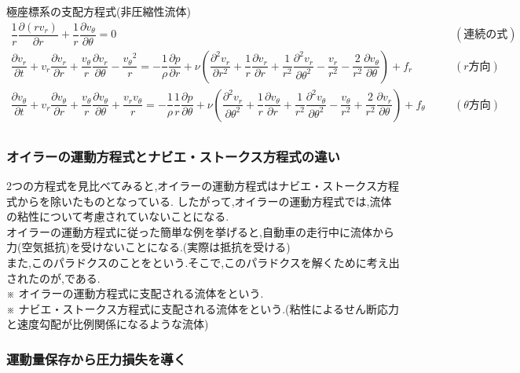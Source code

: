 \documentclass[a4paper]{jsarticle}
\begin{document}
\begin{itembox}[l]{極座標系の支配方程式\quad(非圧縮性流体)}
    \begin{eqnarray*}
        \dfrac{1}{r}\dfrac{\partial \left(rv_r\right)}{\partial r}+\dfrac{1}{r}\dfrac{\partial v_\theta}{\partial \theta}=0\quad&&(連続の式)\\
        \dfrac{\partial v_r}{\partial t}+v_r\dfrac{\partial v_r}{\partial r}+\dfrac{v_\theta}{r}\dfrac{\partial v_r}{\partial \theta}-\dfrac{{v_\theta}^2}{r}=-\dfrac{1}{\rho}\dfrac{\partial p}{\partial r}+\nu \left(\dfrac{\partial^2 v_r}{\partial r^2}+\dfrac{1}{r}\dfrac{\partial v_r}{\partial r}+\dfrac{1}{r^2}\dfrac{\partial^2 v_r}{\partial \theta^2}-\dfrac{v_r}{r^2}-\dfrac{2}{r^2}\dfrac{\partial v_\theta}{\partial \theta}\right)+f_r\quad&&(r方向)\\
        \dfrac{\partial v_\theta}{\partial t}+v_r\dfrac{\partial v_\theta}{\partial r}+\dfrac{v_\theta}{r}\dfrac{\partial v_\theta}{\partial \theta}+\dfrac{v_rv_\theta}{r}=-\dfrac{1}{\rho}\dfrac{1}{r}\dfrac{\partial p}{\partial \theta}+\nu\left(\dfrac{\partial^2 v_r}{\partial \theta^2}+\dfrac{1}{r}\dfrac{\partial v_\theta}{\partial r}+\dfrac{1}{r^2}\dfrac{\partial^2 v_\theta}{\partial \theta^2}-\dfrac{v_\theta}{r^2}+\dfrac{2}{r^2}\dfrac{\partial v_r}{\partial \theta}\right)+f_\theta\quad&&(\theta 方向)\\
    \end{eqnarray*}
\end{itembox}
\subsubsection{オイラーの運動方程式とナビエ・ストークス方程式の違い}
2つの方程式を見比べてみると,オイラーの運動方程式はナビエ・ストークス方程式からを除いたものとなっている.
したがって,オイラーの運動方程式では,流体の粘性について考慮されていないことになる.\\
オイラーの運動方程式に従った簡単な例を挙げると,自動車の走行中に流体から力(空気抵抗)を受けないことになる.(実際は抵抗を受ける)\\
また,このパラドクスのことをという.そこで,このパラドクスを解くために考え出されたのが,である.\\
※ オイラーの運動方程式に支配される流体をという.\\
※ ナビエ・ストークス方程式に支配される流体をという.(粘性によるせん断応力と速度勾配が比例関係になるような流体)
\subsubsection{運動量保存から圧力損失を導く}
\end{document}
